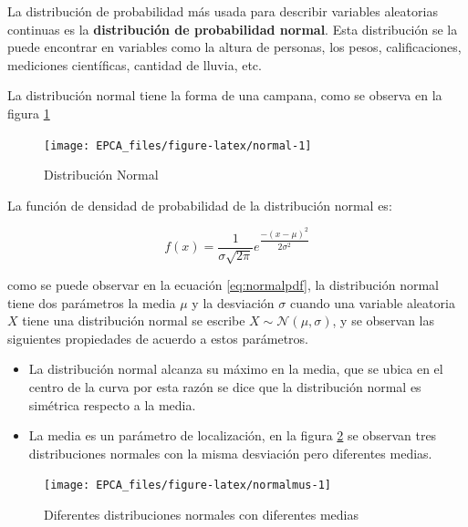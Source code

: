 \documentclass[letterpaper,]{book}
\providecommand{\tightlist}{%
  \setlength{\itemsep}{0pt}\setlength{\parskip}{0pt}}
\begin{document}
La distribución de probabilidad más usada para describir variables aleatorias continuas es la \textbf{distribución de probabilidad normal}. Esta distribución se la puede encontrar en variables como la altura de personas, los pesos, calificaciones, mediciones científicas, cantidad de lluvia, etc.

La distribución normal tiene la forma de una campana, como se observa en la figura \ref{fig:normal}

\begin{figure}[h!]

{\centering \texttt{[image: EPCA\_files/figure-latex/normal-1]} 

}

\caption{Distribución Normal}\label{fig:normal}
\end{figure}

La función de densidad de probabilidad de la distribución normal es:

\begin{equation} 
f\left(x\right)=\dfrac{1}{\sigma\sqrt{2\pi}}e^{\dfrac{-\left(x-\mu\right)^2}{2\sigma^2}}
\label{eq:normalpdf}
\end{equation}

como se puede observar en la ecuación \eqref{eq:normalpdf}, la distribución normal tiene dos parámetros la media \(\mu\) y la desviación \(\sigma\) cuando una variable aleatoria \(X\) tiene una distribución normal se escribe \(X \sim \mathcal{N}\left(\mu,\sigma \right)\), y se observan las siguientes propiedades de acuerdo a estos parámetros.

\begin{itemize}
\tightlist
\item
  La distribución normal alcanza su máximo en la media, que se ubica en el centro de la curva por esta razón se dice que la distribución normal es simétrica respecto a la media.
\item
  La media es un parámetro de localización, en la figura \ref{fig:normalmus} se observan tres distribuciones normales con la misma desviación pero diferentes medias.
\end{itemize}

\begin{figure}[h!]

{\centering \texttt{[image: EPCA\_files/figure-latex/normalmus-1]} 

}

\caption{Diferentes distribuciones normales con diferentes medias}\label{fig:normalmus}
\end{figure}
\end{document}
